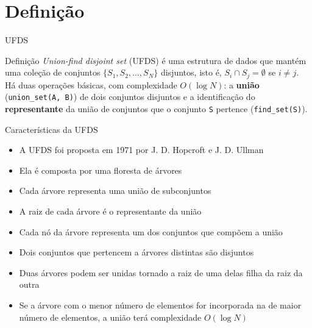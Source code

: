 \section{Definição}

\begin{frame}[fragile]{UFDS}

    \begin{block}{Definição}
        \textit{Union-find disjoint set} (UFDS) é uma estrutura de dados que mantém uma coleção
        de conjuntos $\lbrace S_1, S_2, \ldots, S_N\rbrace$ disjuntos, isto é, $S_i\cap S_j =
        \emptyset$ se $i\neq j$. Há duas operações básicas, com complexidade $O(\log N)$: a 
        \textbf{união} (\texttt{union\_set(A, B)}) de dois conjuntos disjuntos e a identificação 
        do \textbf{representante} da união de conjuntos que o conjunto \texttt{S} pertence 
        (\texttt{find\_set(S)}).
    \end{block}

\end{frame}

\begin{frame}[fragile]{Características da UFDS}

    \begin{itemize}
        \item A UFDS foi proposta em 1971 por J. D. Hopcroft e J. D. Ullman

        \item Ela é composta por uma floresta de árvores

        \item Cada árvore representa uma união de subconjuntos

        \item A raiz de cada árvore é o representante da união

        \item Cada nó da árvore representa um dos conjuntos que compõem a união

        \item Dois conjuntos que pertencem a árvores distintas são disjuntos

        \item Duas árvores podem ser unidas tornado a raiz de uma delas filha da raiz da outra

        \item Se a árvore com o menor número de elementos for incorporada na de maior número de
            elementos, a união terá complexidade $O(\log N)$
    \end{itemize}

\end{frame}

